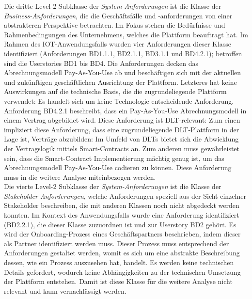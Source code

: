 Die dritte Level-2 Subklasse der \textit{System-Anforderungen} ist die Klasse der \textit{Business-Anforderungen}, die die Geschäftsfälle und -anforderungen von einer abstrakteren Perspektive betrachten. Im Fokus stehen die Bedürfnisse und Rahmenbedingungen des Unternehmens, welches die Plattform beauftragt hat. Im Rahmen des IOT-Anwendungsfalls wurden vier Anforderungen dieser Klasse identifiziert (Anforderungen BD1.1.1, BD2.1.1, BD3.1.1 und BD4.2.1); betroffen sind die Userstories BD1 bis BD4. Die Anforderungen decken das Abrechnungsmodell Pay-As-You-Use ab und beschäftigen sich mit der aktuellen und zukünftigen geschäftlichen Ausrichtung der Plattform. Letzteres hat keine Auswirkungen auf die technische Basis, die die zugrundeliegende Plattform verwendet: Es handelt sich um keine Technologie-entscheidende Anforderung. Anforderung BD4.2.1 beschreibt, dass ein Pay-As-You-Use Abrechnungsmodell in einem Vertrag abgebildet wird. Diese Anforderung ist \ac{DLT}-relevant: Zum einen impliziert diese Anforderung, dass eine zugrundeliegende \ac{DLT}-Plattform in der Lage ist, Verträge abzubilden: Im Umfeld von \acp{DLT} bietet sich die Abwicklung der Vertragslogik mittels Smart-Contracts an. Zum anderen muss gewährleistet sein, dass die Smart-Contract Implementierung mächtig genug ist, um das Abrechnungsmodell Pay-As-You-Use codieren zu können. Diese Anforderung muss in die weitere Analyse miteinbezogen werden.\\

Die vierte Level-2 Subklasse der \textit{System-Anforderungen} ist die Klasse der \textit{Stakeholder-Anforderungen}, welche Anforderungen speziell aus der Sicht einzelner Stakeholder beschreiben, die mit anderen Klassen noch nicht abgedeckt werden konnten. Im Kontext des Anwendungsfalls wurde eine Anforderung identifiziert (BD2.2.1), die dieser Klasse zuzuordnen ist und zur Userstory BD2 gehört. Es wird der Onboarding-Prozess eines Geschäftspartners beschrieben, indem dieser als Partner identifiziert werden muss. Dieser Prozess muss entsprechend der Anforderungen gestaltet werden, womit es sich um eine abstrakte Beschreibung dessen, wie ein Prozess auszusehen hat, handelt. Es werden keine technischen Details gefordert, wodurch keine Abhängigkeiten zu der technischen Umsetzung der Plattform entstehen. Damit ist diese Klasse für die weitere Analyse nicht relevant und kann vernachlässigt werden.\\

